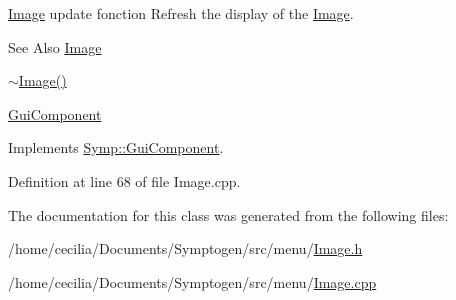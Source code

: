 \hyperlink{class_symp_1_1_image}{Image} update fonction Refresh the display of the \hyperlink{class_symp_1_1_image_afc591fe2f9770e6139509c4c62ffd3c1}{Image}. 

\begin{DoxySeeAlso}{See Also}
\hyperlink{class_symp_1_1_image}{Image} 

\hyperlink{class_symp_1_1_image_a14ac6d979d7c3aed090183e64d42da1d}{$\sim$\-Image()} 

\hyperlink{class_symp_1_1_gui_component}{Gui\-Component} 
\end{DoxySeeAlso}


Implements \hyperlink{class_symp_1_1_gui_component_add73e07ea0a3c9c1c90640e783a3b5de}{Symp\-::\-Gui\-Component}.



Definition at line 68 of file Image.\-cpp.



The documentation for this class was generated from the following files\-:\begin{DoxyCompactItemize}
\item 
/home/cecilia/\-Documents/\-Symptogen/src/menu/\hyperlink{_image_8h}{Image.\-h}\item 
/home/cecilia/\-Documents/\-Symptogen/src/menu/\hyperlink{_image_8cpp}{Image.\-cpp}\end{DoxyCompactItemize}
